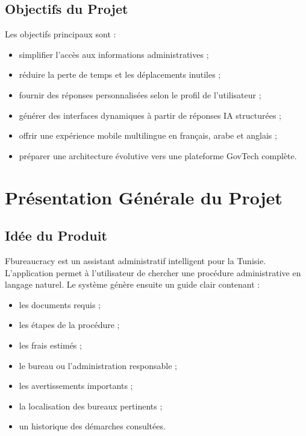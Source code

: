 \documentclass[12pt,a4paper]{report}
\begin{document}
\section{Objectifs du Projet}

Les objectifs principaux sont :

\begin{itemize}
    \item simplifier l'accès aux informations administratives ;
    \item réduire la perte de temps et les déplacements inutiles ;
    \item fournir des réponses personnalisées selon le profil de l'utilisateur ;
    \item générer des interfaces dynamiques à partir de réponses IA structurées ;
    \item offrir une expérience mobile multilingue en français, arabe et anglais ;
    \item préparer une architecture évolutive vers une plateforme GovTech complète.
\end{itemize}


\chapter{Présentation Générale du Projet}

\section{Idée du Produit}

Fbureaucracy est un assistant administratif intelligent pour la Tunisie. L'application permet à l'utilisateur de chercher une procédure administrative en langage naturel. Le système génère ensuite un guide clair contenant :

\begin{itemize}
    \item les documents requis ;
    \item les étapes de la procédure ;
    \item les frais estimés ;
    \item le bureau ou l'administration responsable ;
    \item les avertissements importants ;
    \item la localisation des bureaux pertinents ;
    \item un historique des démarches consultées.
\end{itemize}
\end{document}
